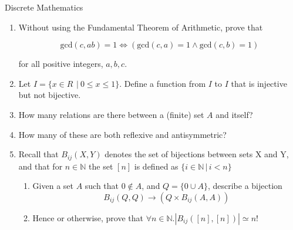 \documentclass{tripos}  %
\begin{document}
\begin{question}[MockIA,year=2024,paper=1,question=3,author=rrw]{Discrete Mathematics}

  \begin{enumerate}
   
  \item Without using the Fundamental Theorem of Arithmetic, prove that

    \[
    \mbox{gcd}(c,ab) = 1 \Leftrightarrow ( \mbox{gcd}(c,a) = 1 \wedge{} \mbox{gcd}(c,b) = 1)
    \]

    for all positive integers, $a,b,c$.

  \item Let $I = \{ x \in R\, ~|~ 0 \le x \le 1 \}$. Define a function from $I$ to $I$ that is injective but not bijective. 
  \item How many relations are there between a (finite) set $A$ and itself? 
  \item How many of these are both reflexive and antisymmetric? 


  \item Recall that $B_{ij}(X,Y)$ denotes the set of bijections between sets X and Y, and that for $n \in \mathbb{N}$ the set $[n]$ is defined as $\{i \in \mathbb{N}\, |\, i < n\}$
    \begin{enumerate}
    \item Given a set $A$ such that $0 \notin A$, and $Q=\{ 0 \cup A \}$, describe a bijection
      \[
      B_{ij}(Q,Q) \rightarrow ( Q \times B_{ij}(A,A) )
      \]
    \item Hence or otherwise, prove that $\forall n \in \mathbb{N}.| B_{ij}([n], [n]) | \simeq n!$ 
      \end{enumerate}
  \end{enumerate}
  
\end{question}
\end{document}
